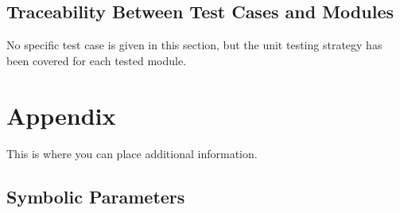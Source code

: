 \documentclass[12pt, titlepage]{article}
\begin{document}
















\subsection{Traceability Between Test Cases and Modules}


No specific test case is given in this section, but the unit testing strategy
has been covered for each tested module.

\newpage

\printbibliography{}

\newpage

\section{Appendix}

This is where you can place additional information.

\subsection{Symbolic Parameters}
\end{document}

